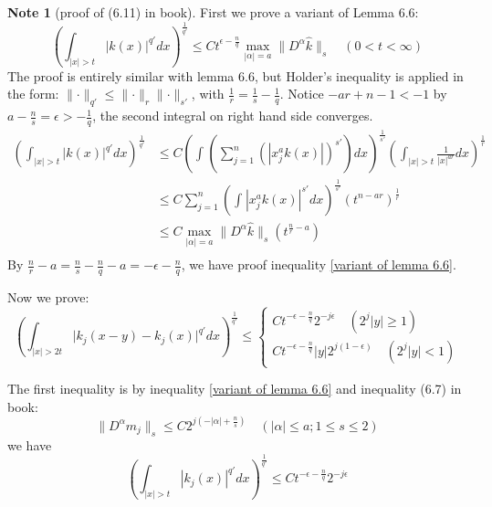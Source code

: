 \documentclass{report}
\theoremstyle{definition}
\newtheorem{note}{Note}
\theoremstyle{definition}
\theoremstyle{plain}
\numberwithin{theorem}{subsection}
\numberwithin{remark}{subsection}
\newcommand{\norm}[1]{\lVert#1\rVert}
\newcommand{\abs}[1]{\left\lvert#1\right\rvert}
\newcommand{\absl}[1]{\lvert#1\rvert}
\begin{document}
\begin{note}[proof of (6.11) in book]
    First we prove a variant of Lemma 6.6:
    \begin{equation}\label{variant of lemma 6.6}
        (\int_{\abs{x}>t}\abs{k(x)}^{q'}dx)^\frac{1}{q'}\leq C t^{\epsilon-\frac{n}{q}}\max_{\abs{\alpha}=a}{\norm{D^{\alpha}\hat{k}}_s}\quad (0<t<\infty)
    \end{equation}
    The proof is entirely similar with lemma 6.6, but Holder's inequality is applied
    in the form: $\norm{\cdot}_{q'}\leq \norm{\cdot}_{r}\norm{\cdot}_{s'}$, with $\frac{1}{r}=\frac{1}{s}-\frac{1}{q}$. Notice $-ar+n-1<-1$ by $a-\frac{n}{s}=\epsilon>-\frac{1}{q}$, the second integral on right hand side converges.
    \begin{align*}
        (\int_{\abs{x}>t}\abs{k(x)}^{q'}dx)^\frac{1}{q'} & \leq C(\int_{}(\sum_{j=1}^n(\abs{x_j^ak(x)})^{s'})dx)^{\frac{1}{s'}}  (\int_{\abs{x}>t}^{} \frac{1}{\abs{x}^{ar}}dx)^{\frac{1}{r}} \\
                                                         & \leq C\sum_{j=1}^n(\int_{}\abs{x_j^ak(x)}^{s'}dx)^{\frac{1}{s'}}  (t^{n-a r})^{\frac{1}{r}}                                        \\
                                                         & \leq C\max_{\abs{\alpha}=a}{\norm{D^\alpha\hat{k}}_s}  (t^{\frac{n}{r}-a})                                                         \\
    \end{align*}
    By $\frac{n}{r}-a=\frac{n}{s}-\frac{n}{q}-a=-\epsilon-\frac{n}{q}$, we have proof inequality \eqref{variant of lemma 6.6}.\par
    Now we prove:
    \[
        (\int_{\abs{x}>2t}\absl{k_j(x-y)-k_j(x)}^{q'}dx)^\frac{1}{q'}\leq\left\{
        \begin{aligned}
            Ct^{-\epsilon-\frac{n}{q}}2^{-j\epsilon}\quad (2^j\abs{y}\geq 1) \\
            C t^{-\epsilon-\frac{n}{q}} \abs{y}2^{j(1-\epsilon)}\quad (2^j\abs{y}<1)
        \end{aligned}
        \right.
    \]

    The first inequality is by inequality \eqref{variant of lemma 6.6} and inequality (6.7) in book:
    \begin{equation*}
        \norm{D^{\alpha}m_j}_s\leq C 2^{j(-\abs{\alpha}+\frac{n}{s})}\quad (\abs{\alpha}\leq a; 1\leq s\leq 2)
    \end{equation*}
    we have
    \begin{equation}\label{variant 2 of lemma 6.6}
        (\int_{\abs{x}>t}\abs{k_j(x)}^{q'}dx)^\frac{1}{q'}\leq Ct^{-\epsilon-\frac{n}{q}}2^{-j\epsilon}
    \end{equation}



\end{note}
\end{document}
